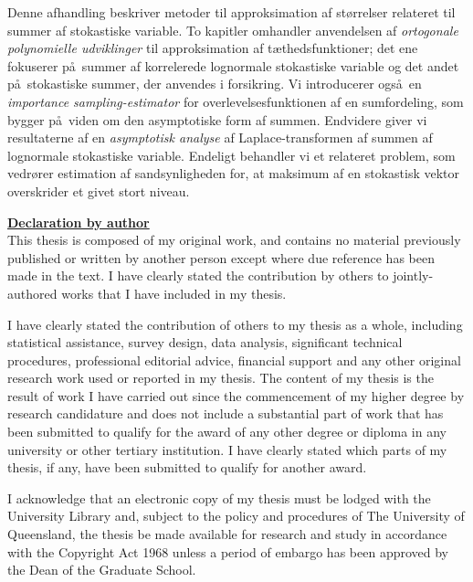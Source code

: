 Denne afhandling beskriver metoder til approksimation af st\o rrelser relateret til summer af stokastiske variable. To kapitler omhandler anvendelsen af \emph {ortogonale polynomielle udviklinger} til approksimation af t\ae thedsfunktioner; det ene fokuserer p\aa\ summer af korrelerede lognormale stokastiske variable og det andet p\aa\ stokastiske summer, der anvendes i forsikring.
Vi introducerer ogs\aa\ en \emph{importance sampling-estimator} for overlevelsesfunktionen af en sumfordeling, som bygger p\aa\ viden om den asymptotiske form af summen.
Endvidere giver vi resultaterne af en \emph {asymptotisk analyse}
af Laplace-transformen af summen af lognormale stokastiske variable. Endeligt behandler vi et relateret problem, som vedr\o rer estimation af sandsynligheden for, at maksimum af en stokastisk vektor overskrider et givet stort niveau.


\newpage
{\bf \underline{Declaration by author}} \\

This thesis is composed of my original work, and contains no material
previously published or written by another person except where due reference
has been made in the text. I have clearly stated the contribution by others to
jointly-authored works that I have included in my thesis.

I have clearly stated the contribution of others to my thesis as a whole,
including statistical assistance, survey design, data analysis, significant
technical procedures, professional editorial advice, financial support and any other original
research work used or reported in my thesis. The content of my thesis is the
result of work I have carried out since the commencement of my higher
degree by research candidature and does not include a substantial part of work
that has been submitted to qualify for the award of any other degree or diploma
in any university or other tertiary institution. I have clearly stated which parts
of my thesis, if any, have been submitted to qualify for another award.

I acknowledge that an electronic copy of my thesis must be lodged with the
University Library and, subject to the policy and procedures of The University
of Queensland, the thesis be made available for research and study in accordance
with the Copyright Act 1968 unless a period of embargo has been approved by the
Dean of the Graduate School.

